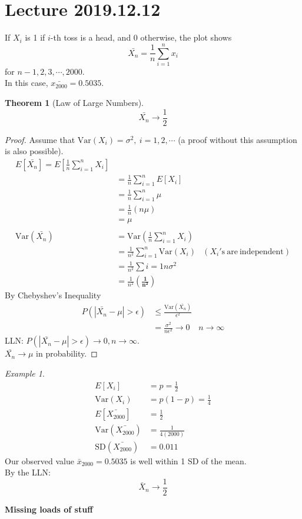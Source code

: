 \documentclass{article}
\let\ddd\cdots
\newtheorem{theorem}{Theorem}[section]
\theoremstyle{definition}
\theoremstyle{remark}
\theoremstyle{example}
\newtheorem*{example}{Example}
\newcommand{\Var}[1]{\mathrm{Var}\left(#1\right)}
\begin{document}
	\section*{Lecture 2019.12.12}
	If $X_i$ is 1 if $i$-th toss is a head, and 0 otherwise, the plot shows \[\bar{X_n}=\frac{1}{n}\sum_{i=1}^{n}x_i \]
	for $n-1,2,3,\ddd,2000$.\\
	In this case, $\bar{x_2000}=0.5035$.
	\begin{theorem}[Law of Large Numbers]
		\[ \bar{X_n} \to \frac12 \]	
	\end{theorem}
	\begin{proof}
		Assume that $\Var{X_i}=\sigma^2,\ i=1,2,\ddd$ (a proof without this assumption is also possible).
		\begin{align*}
			E[\bar{X_n}]=E\left[ \frac1n \sum_{i=1}^{n}X_i \right]\\
			&= \frac1n \sum_{i=1}^{n}E[X_i]\\
			&= \frac1n \sum_{i=1}^{n}\mu\\
			&= \frac1n \left(n \mu\right) \\
			&= \mu\\
			\\
			\Var{\bar{X_n}}&=\Var{\frac1n \sum_{i=1}^{n} X_i}\\
			&=\frac1{n^2}\sum_{i=1}^{n}\Var{X_i} & (X_i\mathrm{'s\ are\ independent})\\
			&= \frac1{n^2}\sum{i=1}n \sigma^2\\
			&= \frac{1}{n^2}\mathbf{\left(\frac{1}{n^2}\right)}
		\end{align*}
		By Chebyshev's Inequality
		\begin{align*}
			P(|\bar{X_n}-\mu|>\epsilon) &\leq \frac{\Var{\bar{X_n}}}{\epsilon^2}\\
			&= \frac{\sigma^2}{n \epsilon^2} \to 0& n \to \infty
		\end{align*}
		LLN: $P(|\bar{X_n}-\mu| > \epsilon) \to 0, n \to \infty$.\\
		$\bar{X_n}\to \mu $ in probability.
	\end{proof}

	\begin{example}
		\begin{align*}
			E[X_i]&=p=\frac12\\
			\Var{X_i}&=p(1-p)=\frac14\\
			E[\bar{X_2000}]&=\frac12\\
			\Var{\bar{X_2000}}&=\frac{1}{4(2000)}\\
			\mathrm{SD}(\bar{X_2000})&=0.011
		\end{align*}
		Our observed value $\bar{x}_{2000}=0.5035$ is well within 1 SD of the mean.\\
		By the LLN: \[\bar{X}_n\to \frac12 \]
	\end{example}
	\textbf{Missing loads of stuff}
\end{document}
